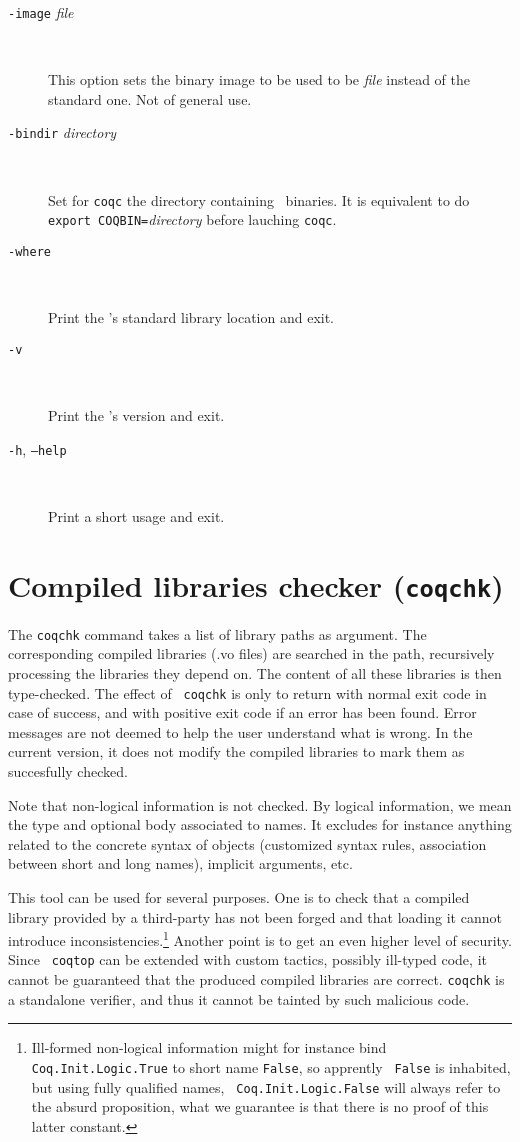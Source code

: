 \begin{description}
\item[{\tt -image} {\em file}]\ 

  This option sets the binary image to be used to be {\em file}
  instead of the standard one. Not of general use.

\item[{\tt -bindir} {\em directory}]\ 

  Set for {\tt coqc} the directory containing \Coq\ binaries.
  It is equivalent to do \texttt{export COQBIN=}{\em directory}
  before lauching {\tt coqc}.

\item[{\tt -where}]\ 

  Print the \Coq's standard library location and exit.

\item[{\tt -v}]\ 

  Print the \Coq's version and exit.

\item[{\tt -h}, {\tt --help}]\ 

  Print a short usage and exit.

\end{description}


\section{Compiled libraries checker ({\tt coqchk})}

The {\tt coqchk} command takes a list of library paths as argument.
The corresponding compiled libraries (.vo files) are searched in the
path, recursively processing the libraries they depend on. The content
of all these libraries is then type-checked. The effect of {\tt
  coqchk} is only to return with normal exit code in case of success,
and with positive exit code if an error has been found. Error messages
are not deemed to help the user understand what is wrong. In the
current version, it does not modify the compiled libraries to mark
them as succesfully checked.

Note that non-logical information is not checked. By logical
information, we mean the type and optional body associated to names.
It excludes for instance anything related to the concrete syntax of
objects (customized syntax rules, association between short and long
names), implicit arguments, etc.

This tool can be used for several purposes. One is to check that a
compiled library provided by a third-party has not been forged and
that loading it cannot introduce inconsistencies.\footnote{Ill-formed
  non-logical information might for instance bind {\tt
    Coq.Init.Logic.True} to short name {\tt False}, so apprently {\tt
    False} is inhabited, but using fully qualified names, {\tt
    Coq.Init.Logic.False} will always refer to the absurd proposition,
  what we guarantee is that there is no proof of this latter
  constant.}
Another point is to get an even higher level of security. Since {\tt
  coqtop} can be extended with custom tactics, possibly ill-typed
code, it cannot be guaranteed that the produced compiled libraries are
correct. {\tt coqchk} is a standalone verifier, and thus it cannot be
tainted by such malicious code.

